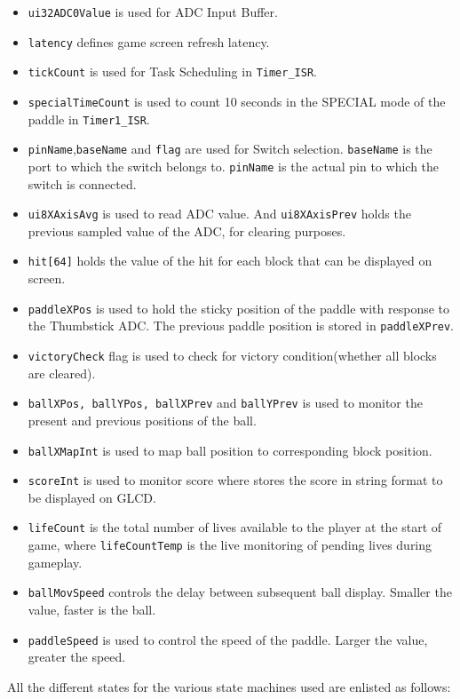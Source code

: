 \documentclass{article}
\begin{document}
\begin{itemize}
  \item \texttt{ui32ADC0Value} is used for ADC Input Buffer.
  \item \texttt{latency} defines game screen refresh latency.
  \item \texttt{tickCount} is used for Task Scheduling in \texttt{Timer\_ISR}.
  \item \texttt{specialTimeCount} is used to count 10 seconds in the SPECIAL mode of the paddle in \texttt{Timer1\_ISR}.
  \item \texttt{pinName},\texttt{baseName} and \texttt{flag} are used for Switch selection. \texttt{baseName} is the port to which the switch belongs to. \texttt{pinName} is the actual pin to which the switch is connected.
  \item \texttt{ui8XAxisAvg} is used to read ADC value. And \texttt{ui8XAxisPrev} holds the previous sampled value of the ADC, for clearing purposes.
  \item \texttt{hit[64]} holds the value of the hit for each block that can be displayed on screen.
  \item \texttt{paddleXPos} is used to hold the sticky position of the paddle with response to the Thumbstick ADC. The previous paddle position is stored in \texttt{paddleXPrev}.
  \item \texttt{victoryCheck} flag is used to check for victory condition(whether all blocks are cleared).
  \item \texttt{ballXPos, ballYPos, ballXPrev} and \texttt{ballYPrev} is used to monitor the present and previous positions of the ball.
  \item \texttt{ballXMapInt} is used to map ball position to corresponding block position.
  \item \texttt{scoreInt} is used to monitor score where  stores the score in string format to be displayed on GLCD.
  \item \texttt{lifeCount} is the total number of lives available to the player at the start of game, where \texttt{lifeCountTemp} is the live monitoring of pending lives during gameplay.
  \item \texttt{ballMovSpeed} controls the delay between subsequent ball display. Smaller the value, faster is the ball.
  \item \texttt{paddleSpeed} is used to control the speed of the paddle. Larger the value, greater the speed.
\end{itemize}
\qquad All the different states for the various state machines used are enlisted as follows:
\end{document}
